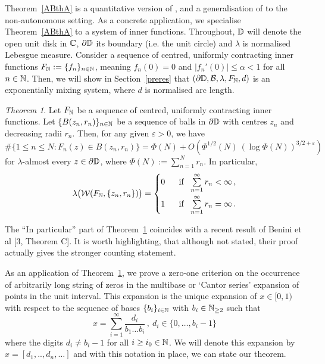 \documentclass[11pt,reqno]{amsart}
\newcommand{\N}{{\Bbb N}}
\newcommand{\C}{{\Bbb C}}
\newcommand{\D}{{\Bbb D}}
\newcommand{\0}{\mathbf{0}}
\newtheorem{TAA}{Theorem}
\theoremstyle{remark}
\numberwithin{equation}{section}
\newtheorem{TAA}{Theorem}
\theoremstyle{remark}
\numberwithin{equation}{section}
\begin{document}
 Theorem~\ref{ABthA} is a quantitative version of \cite[Theorem~1]{FMP}, and a generalisation of \cite[Theorem~1]{LLVZ} to the non-autonomous setting.
As a concrete application, we specialise Theorem~\ref{ABthA} to a system  of inner functions. Throughout, $\D$ will denote the open unit disk in $\C$, $\partial \D$ its boundary (i.e. the unit circle) and $\lambda$ is normalised Lebesgue measure. Consider a sequence of centred, uniformly contracting inner functions $F_\N := \{f_n\}_{n \in \N}$, meaning $f_n(0) = 0$ and $|f_n'(0)| \le \alpha < 1$ for all $n \in \N$.  
Then, we will show in Section~\ref{preres} that $(\partial\D, \mathcal{B}, \lambda, F_\N, d)$ is an exponentially mixing system, where $d$ is normalised arc length.
\begin{TAA}\label{ABthB}
Let $F_\N $ be a sequence of centred, uniformly contracting inner functions. Let  $\{B(z_n,r_n)\}_{n \in \N}$ be a sequence of balls in $\partial \D$ with centres $z_n$ and decreasing radii $r_n$.
Then, for any given $\varepsilon>0$, we have
\begin{equation*} \# \big\{ 1\le n \le   N :  F_n(z) \in B(z_n,r_n)\big\}  =\Phi(N)+O\left(\Phi^{1/2}(N) \ (\log\Phi(N))^{3/2+\varepsilon}\right)
\end{equation*}
\noindent for $\lambda$-almost every $z\in \partial\D$, where
$\Phi(N):=\sum\limits_{n=1}^N r_n$.
In particular,
 \begin{eqnarray*}
   \lambda \big( \mathcal{W}(F_\N,\{z_n, r_n\}) \big) = \begin{cases}
        0 &\text{ \ if}\ \  \sum\limits_{n=1}^\infty r_n <\infty \, ,\\[2ex]
        1 &\text{ \ if}\ \  \sum\limits_{n=1}^\infty r_n
        =\infty \, .
    \end{cases}
	\end{eqnarray*}
 
\end{TAA}
The ``In particular'' part of Theorem~\ref{ABthB} coincides with a recent result  of  Benini et al [3, Theorem C]. It is worth highlighting, that although not stated, their  proof  actually gives the stronger counting statement.    

As an application of Theorem~\ref{ABthB}, we prove a zero-one criterion on the occurrence of arbitrarily long string of zeros in the multibase or `Cantor series' expansion of points in the unit interval.
This expansion is the unique expansion of $x \in [0,1)$ with respect to the sequence of bases $\{b_i\}_{i \in \N}$ with $b_i \in \N_{\geq 2}$ such that
$$
x = \sum_{i=1}^{\infty} \frac{d_i}{b_1\dots b_i} \, , \  d_i \in \{0,\dots,b_i-1\} 
$$
where the digits $d_i \neq b_i -1$ for all $i \geq i_0\in \N$.
We will denote this expansion by $x= [d_1,..,d_n,\dots]$ and with this notation in place, we can state our theorem. 
\end{document}
